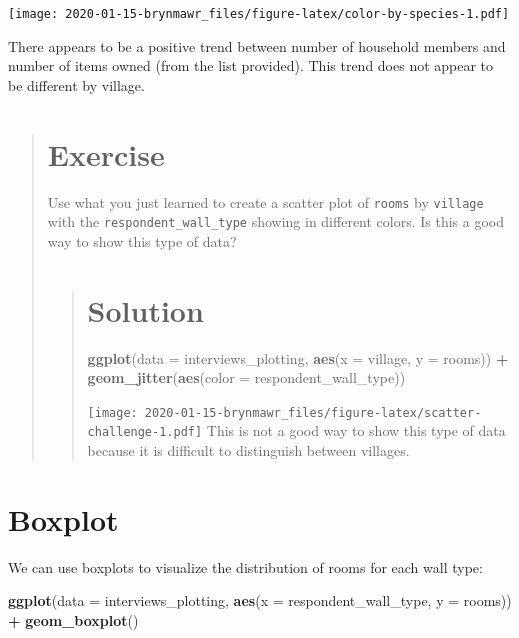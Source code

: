 \documentclass[]{book}
\newenvironment{Shaded}{\begin{snugshade}}{\end{snugshade}}
\newcommand{\KeywordTok}[1]{\textcolor[rgb]{0.13,0.29,0.53}{\textbf{#1}}}
\newcommand{\DataTypeTok}[1]{\textcolor[rgb]{0.13,0.29,0.53}{#1}}
\newcommand{\StringTok}[1]{\textcolor[rgb]{0.31,0.60,0.02}{#1}}
\newcommand{\OperatorTok}[1]{\textcolor[rgb]{0.81,0.36,0.00}{\textbf{#1}}}
\newcommand{\NormalTok}[1]{#1}
\begin{document}
\texttt{[image: 2020-01-15-brynmawr\_files/figure-latex/color-by-species-1.pdf]}

There appears to be a positive trend between number of household members
and number of items owned (from the list provided). This trend does not
appear to be different by village.

\begin{quote}
\section{Exercise}\label{exercise-11}

Use what you just learned to create a scatter plot of \texttt{rooms} by
\texttt{village} with the \texttt{respondent\_wall\_type} showing in
different colors. Is this a good way to show this type of data?

\begin{quote}
\section{Solution}\label{solution-13}

\begin{Shaded}
\begin{Highlighting}[]
\KeywordTok{ggplot}\NormalTok{(}\DataTypeTok{data =}\NormalTok{ interviews_plotting, }\KeywordTok{aes}\NormalTok{(}\DataTypeTok{x =}\NormalTok{ village, }\DataTypeTok{y =}\NormalTok{ rooms)) }\OperatorTok{+}
\KeywordTok{geom_jitter}\NormalTok{(}\KeywordTok{aes}\NormalTok{(}\DataTypeTok{color =}\NormalTok{ respondent_wall_type))}
\end{Highlighting}
\end{Shaded}

\texttt{[image: 2020-01-15-brynmawr\_files/figure-latex/scatter-challenge-1.pdf]}
This is not a good way to show this type of data because it is difficult
to distinguish between villages.
\end{quote}
\end{quote}

\section{Boxplot}\label{boxplot}

We can use boxplots to visualize the distribution of rooms for each wall
type:

\begin{Shaded}
\begin{Highlighting}[]
\KeywordTok{ggplot}\NormalTok{(}\DataTypeTok{data =}\NormalTok{ interviews_plotting, }\KeywordTok{aes}\NormalTok{(}\DataTypeTok{x =}\NormalTok{ respondent_wall_type, }\DataTypeTok{y =}\NormalTok{ rooms)) }\OperatorTok{+}
\StringTok{    }\KeywordTok{geom_boxplot}\NormalTok{()}
\end{Highlighting}
\end{Shaded}
\end{document}
